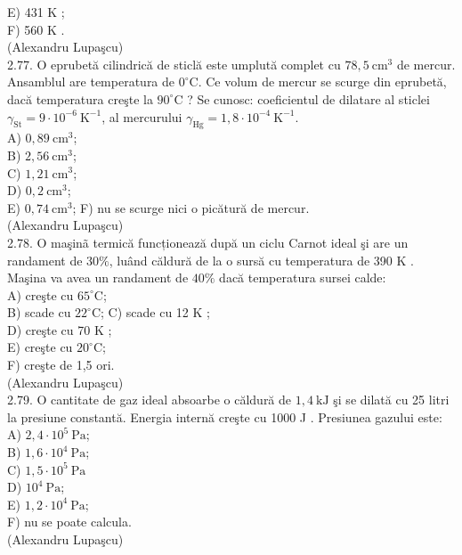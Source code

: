\documentclass[10pt]{article}
\begin{document}
E) 431 K ;\\
F) 560 K .\\
(Alexandru Lupaşcu)\\
2.77. O eprubetă cilindrică de sticlă este umplută complet cu $78,5 \mathrm{~cm}^{3}$ de mercur. Ansamblul are temperatura de $0^{\circ} \mathrm{C}$. Ce volum de mercur se scurge din eprubetă, dacă temperatura creşte la $90^{\circ} \mathrm{C}$ ? Se cunosc: coeficientul de dilatare al sticlei $\gamma_{\mathrm{St}}=9 \cdot 10^{-6} \mathrm{~K}^{-1}$, al mercurului $\gamma_{\mathrm{Hg}}=1,8 \cdot 10^{-4} \mathrm{~K}^{-1}$.\\
A) $0,89 \mathrm{~cm}^{3}$;\\
B) $2,56 \mathrm{~cm}^{3}$;\\
C) $1,21 \mathrm{~cm}^{3}$;\\
D) $0,2 \mathrm{~cm}^{3}$;\\
E) $0,74 \mathrm{~cm}^{3}$; F) nu se scurge nici o picătură de mercur.\\
(Alexandru Lupaşcu)\\
2.78. O maşinã termică funcționează după un ciclu Carnot ideal şi are un randament de $30 \%$, luând căldură de la o sursă cu temperatura de 390 K . Maşina va avea un randament de $40 \%$ dacă temperatura sursei calde:\\
A) creşte cu $65^{\circ} \mathrm{C}$;\\
B) scade cu $22^{\circ} \mathrm{C}$; C) scade cu 12 K ;\\
D) creşte cu 70 K ;\\
E) creşte cu $20^{\circ} \mathrm{C}$;\\
F) creşte de 1,5 ori.\\
(Alexandru Lupaşcu)\\
2.79. O cantitate de gaz ideal absoarbe o căldură de $1,4 \mathrm{~kJ}$ şi se dilată cu 25 litri la presiune constantă. Energia internă creşte cu 1000 J . Presiunea gazului este:\\
A) $2,4 \cdot 10^{5} \mathrm{~Pa}$;\\
B) $1,6 \cdot 10^{4} \mathrm{~Pa}$;\\
C) $1,5 \cdot 10^{5} \mathrm{~Pa}$\\
D) $10^{4} \mathrm{~Pa}$;\\
E) $1,2 \cdot 10^{4} \mathrm{~Pa}$;\\
F) nu se poate calcula.\\
(Alexandru Lupaşcu)\\
\end{document}
